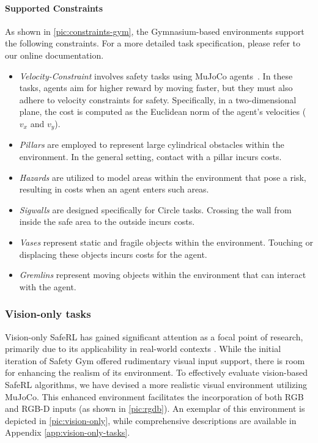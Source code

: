 \documentclass{article}
\begin{document}
\paragraph{Supported Constraints}
As shown in \autoref{pic:constraints-gym}, the Gymnasium-based environments support the following constraints. For a more detailed task specification, please refer to our online documentation.
\begin{itemize}[left=0.3cm]
    \item \textit{Velocity-Constraint} involves safety tasks using MuJoCo agents~\cite{todorov2012mujoco}. In these tasks, agents aim for higher reward by moving faster, but they must also adhere to velocity constraints for safety. Specifically, in a two-dimensional plane, the cost is computed as the Euclidean norm of the agent's velocities ($v_x$ and $v_y$).
    \item \textit{Pillars} are employed to represent large cylindrical obstacles within the environment. In the general setting, contact with a pillar incurs costs.
    \item \textit{Hazards} are utilized to model areas within the environment that pose a risk, resulting in costs when an agent enters such areas.
    \item \textit{Sigwalls} are designed specifically for Circle tasks. Crossing the wall from inside the safe area to the outside incurs costs.
    \item \textit{Vases} represent static and fragile objects within the environment. Touching or displacing these objects incurs costs for the agent.
    \item \textit{Gremlins} represent moving objects within the environment that can interact with the agent.
\end{itemize}

\subsubsection{Vision-only tasks}
Vision-only SafeRL has gained significant attention as a focal point of research, primarily due to its applicability in real-world contexts \cite{ma2022conservative,as2022constrained}. While the initial iteration of Safety Gym offered rudimentary visual input support, there is room for enhancing the realism of its environment. To effectively evaluate vision-based SafeRL algorithms, we have devised a more realistic visual environment utilizing MuJoCo. This enhanced environment facilitates the incorporation of both RGB and RGB-D inputs (as shown in \autoref{pic:rgdb}). An exemplar of this environment is depicted in \autoref{pic:vision-only}, while comprehensive descriptions are available in Appendix \ref{app:vision-only-tasks}.
\end{document}
